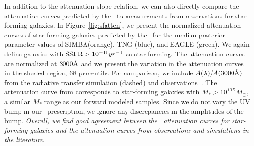 In addition to the attenuation-slope relation, we can also directly compare
the attenuation curves predicted by the \eda~to measurements from
observations for star-forming galaxies. 
In Figure~\ref{fig:sfatten}, we present the normalized attenuation curves
of star-forming galaxies predicted by the \eda~for the median posterior
parameter values of SIMBA(orange), TNG (blue), and EAGLE (green).
We again define galaxies with ${\rm SSFR} > 10^{-11}{yr}^{-1}$ as star-forming.
The attenuation curves are normalized at $3000\AA$ and we present the
variation in the attenuation curves in the shaded region, 68 percentile. 
For comparison, we include $A(\lambda)/A(3000\AA)$ from the
\cite{narayanan2018} radiative transfer simulation (dashed) and 
observations~\citep[][dotted]{salim2018}. 
The attenuation curve from \cite{salim2018} corresponds to star-forming
galaxies with $M_* > 10^{10.5}M_\odot$, a similar $M_*$ range as our
forward modeled samples. 
Since we do not vary the UV bump in our \eda~prescription, we ignore any
discrepancies in the amplitudes of the bump. 
\emph{Overall, we find good agreement between the \eda~attenuation curves for
star-forming galaxies and the attenuation curves from observations and
simulations in the literature.}







